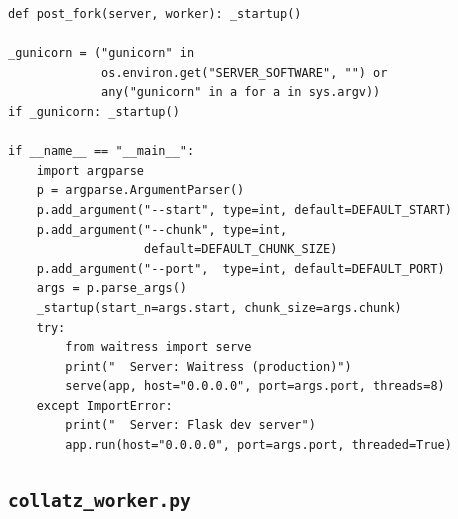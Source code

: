 \documentclass{mcom-l}
\theoremstyle{definition}
\theoremstyle{remark}
\numberwithin{equation}{section}
\begin{document}
\begin{lstlisting}[caption={Coordinator: chunk dispatch, checkpointing,
                             and results collection.},
                   label={lst:coordinator}]
def post_fork(server, worker): _startup()

_gunicorn = ("gunicorn" in
             os.environ.get("SERVER_SOFTWARE", "") or
             any("gunicorn" in a for a in sys.argv))
if _gunicorn: _startup()

if __name__ == "__main__":
    import argparse
    p = argparse.ArgumentParser()
    p.add_argument("--start", type=int, default=DEFAULT_START)
    p.add_argument("--chunk", type=int,
                   default=DEFAULT_CHUNK_SIZE)
    p.add_argument("--port",  type=int, default=DEFAULT_PORT)
    args = p.parse_args()
    _startup(start_n=args.start, chunk_size=args.chunk)
    try:
        from waitress import serve
        print("  Server: Waitress (production)")
        serve(app, host="0.0.0.0", port=args.port, threads=8)
    except ImportError:
        print("  Server: Flask dev server")
        app.run(host="0.0.0.0", port=args.port, threaded=True)
\end{lstlisting}

\subsection{\texttt{collatz\_worker.py}}
\end{document}
